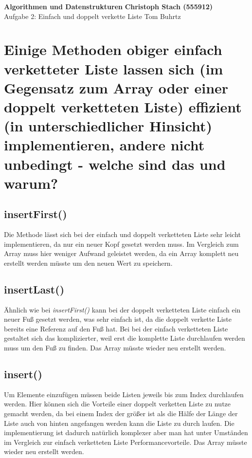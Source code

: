 \documentclass[a4paper, 11pt]{article}
\begin{document}
\noindent
\large\textbf{Algorithmen und Datenstrukturen} \hfill \textbf{Christoph Stach (555912)} \\
\normalsize Aufgabe 2: Einfach und doppelt verkette Liste \hfill Tom Buhrtz \\



\section*{Einige Methoden obiger einfach verketteter Liste lassen sich (im Gegensatz zum
          Array oder einer doppelt verketteten Liste) effizient (in unterschiedlicher Hinsicht)
          implementieren, andere nicht unbedingt - welche sind das und warum?}

\subsection*{insertFirst()}
Die Methode lässt sich bei der einfach und doppelt verketteten Liste sehr leicht implementieren, da nur ein neuer Kopf
gesetzt werden muss. Im Vergleich zum Array muss hier weniger Aufwand geleistet werden, da ein Array komplett neu
erstellt werden müsste um den neuen Wert zu speichern.

\subsection*{insertLast()}

Ähnlich wie bei \textit{insertFirst()} kann bei der doppelt verketteten Liste einfach ein neuer Fuß gesetzt werden, was
sehr einfach ist, da die doppelt verkette Liste bereits eine Referenz auf den Fuß hat. Bei bei der einfach verketteten
Liste gestaltet sich das komplizierter, weil erst die komplette Liste durchlaufen werden muss um den Fuß zu finden.
Das Array müsste wieder neu erstellt werden.

\subsection*{insert()}

Um Elemente einzufügen müssen beide Listen jeweils bis zum Index durchlaufen werden. Hier können sich die Vorteile einer
doppelt verketten Liste zu nutze gemacht werden, da bei einem Index der größer ist als die Hälfe der Länge der Liste auch
von hinten angefangen werden kann die Liste zu durch laufen. Die implementierung ist dadurch natürlich komplexer aber
man hat unter Umständen im Vergleich zur einfach verketteten Liste Performancevorteile. Das Array müsste wieder neu
erstellt werden.
\end{document}
